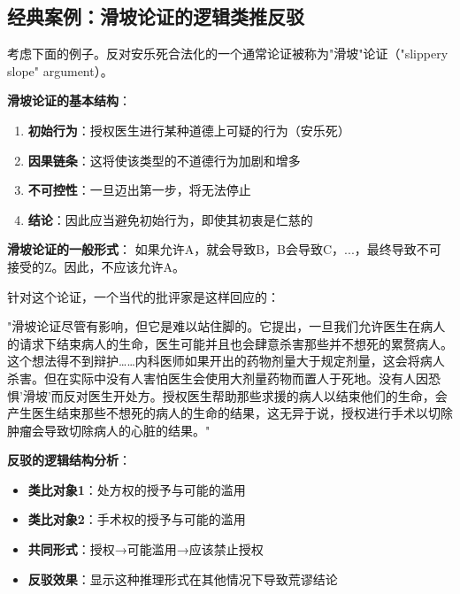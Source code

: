 \subsection{经典案例：滑坡论证的逻辑类推反驳}

\begin{examplebox}[title=滑坡论证的结构分析]
考虑下面的例子。反对安乐死合法化的一个通常论证被称为"滑坡"论证（"slippery slope" argument）。

\textbf{滑坡论证的基本结构}：
\begin{enumerate}
\item \textbf{初始行为}：授权医生进行某种道德上可疑的行为（安乐死）
\item \textbf{因果链条}：这将使该类型的不道德行为加剧和增多
\item \textbf{不可控性}：一旦迈出第一步，将无法停止
\item \textbf{结论}：因此应当避免初始行为，即使其初衷是仁慈的
\end{enumerate}

\textbf{滑坡论证的一般形式}：
如果允许A，就会导致B，B会导致C，...，最终导致不可接受的Z。因此，不应该允许A。
\end{examplebox}

\begin{theorembox}[title=针对滑坡论证的逻辑类推反驳]
针对这个论证，一个当代的批评家是这样回应的：

"滑坡论证尽管有影响，但它是难以站住脚的。它提出，一旦我们允许医生在病人的请求下结束病人的生命，医生可能并且也会肆意杀害那些并不想死的累赘病人。这个想法得不到辩护……内科医师如果开出的药物剂量大于规定剂量，这会将病人杀害。但在实际中没有人害怕医生会使用大剂量药物而置人于死地。没有人因恐惧'滑坡'而反对医生开处方。授权医生帮助那些求援的病人以结束他们的生命，会产生医生结束那些不想死的病人的生命的结果，这无异于说，授权进行手术以切除肿瘤会导致切除病人的心脏的结果。"\cite{rachels1991}

\textbf{反驳的逻辑结构分析}：
\begin{itemize}
\item \textbf{类比对象1}：处方权的授予与可能的滥用
\item \textbf{类比对象2}：手术权的授予与可能的滥用
\item \textbf{共同形式}：授权→可能滥用→应该禁止授权
\item \textbf{反驳效果}：显示这种推理形式在其他情况下导致荒谬结论
\end{itemize}
\end{theorembox}

